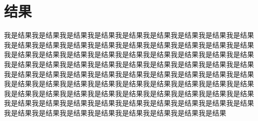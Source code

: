 \chapter{结\qquad 果}

我是结果我是结果我是结果我是结果我是结果我是结果我是结果我是结果我是结果我是结果我是结果我是结果我是结果我是结果我是结果我是结果我是结果我是结果我是结果我是结果我是结果我是结果我是结果我是结果我是结果我是结果我是结果我是结果我是结果我是结果我是结果我是结果我是结果我是结果我是结果我是结果我是结果我是结果我是结果我是结果我是结果我是结果我是结果我是结果我是结果我是结果我是结果我是结果我是结果我是结果我是结果我是结果我是结果我是结果我是结果我是结果我是结果我是结果我是结果我是结果我是结果我是结果我是结果我是结果我是结果我是结果我是结果我是结果我是结果我是结果我是结果我是结果我是结果我是结果我是结果我是结果我是结果我是结果我是结果我是结果